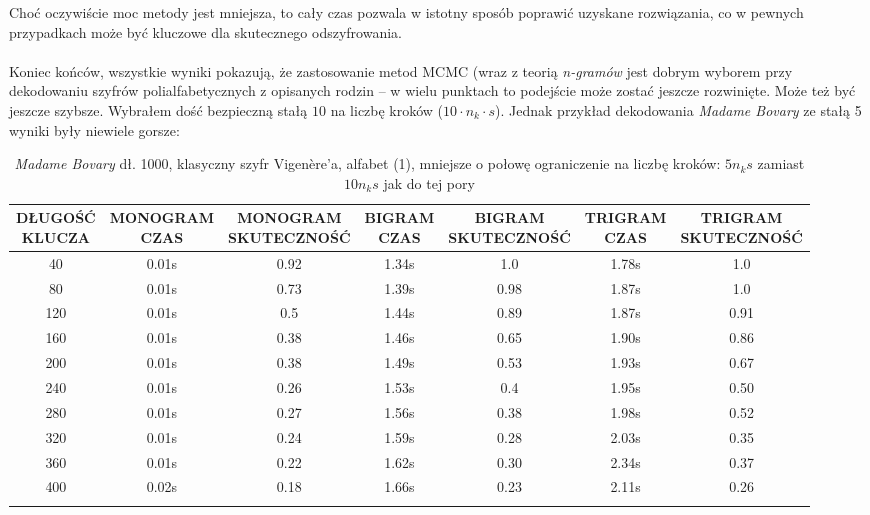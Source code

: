 \documentclass[a4paper]{article}
\theoremstyle{defn}
\theoremstyle{theorem}
\theoremstyle{lemma}
\theoremstyle{cor}
\theoremstyle{fact}
\begin{document}
Choć oczywiście moc metody jest mniejsza, to cały czas pozwala w istotny sposób poprawić uzyskane rozwiązania, co w pewnych przypadkach może być kluczowe dla skutecznego odszyfrowania.\\\\
Koniec końców, wszystkie wyniki pokazują, że zastosowanie metod MCMC (wraz z teorią \textit{n-gramów} jest dobrym wyborem przy dekodowaniu szyfrów polialfabetycznych z opisanych rodzin – w wielu punktach to podejście może zostać jeszcze rozwinięte. Może też być jeszcze szybsze. Wybrałem dość bezpieczną stałą $10$ na liczbę kroków ($10 \cdot n_k \cdot s$). Jednak przykład dekodowania \textit{Madame Bovary} ze stałą 5 wyniki były niewiele gorsze:
\begin{center}\begin{small}\begin{longtable}{|c|c|c|c|c|c|c|} 
\hline \makecell{DŁUGOŚĆ\\KLUCZA} &  \makecell{MONOGRAM\\CZAS} & \makecell{MONOGRAM\\SKUTECZNOŚĆ} & \makecell{BIGRAM\\CZAS} &  \makecell{BIGRAM\\SKUTECZNOŚĆ} & \makecell{TRIGRAM\\CZAS} & \makecell{TRIGRAM\\SKUTECZNOŚĆ}\\ \hline 
40 & 0.01s & 0.92 & 1.34s & 1.0 & 1.78s & 1.0 \\ \hline 
80 & 0.01s & 0.73 & 1.39s & 0.98 & 1.87s & 1.0 \\ \hline 
120 & 0.01s & 0.5 & 1.44s & 0.89 & 1.87s & 0.91 \\ \hline 
160 & 0.01s & 0.38 & 1.46s & 0.65 & 1.90s & 0.86 \\ \hline 
200 & 0.01s & 0.38 & 1.49s & 0.53 & 1.93s & 0.67 \\ \hline 
240 & 0.01s & 0.26 & 1.53s & 0.4 & 1.95s & 0.50 \\ \hline 
280 & 0.01s & 0.27 & 1.56s & 0.38 & 1.98s & 0.52 \\ \hline 
320 & 0.01s & 0.24 & 1.59s & 0.28 & 2.03s & 0.35 \\ \hline 
360 & 0.01s & 0.22 & 1.62s & 0.30 & 2.34s & 0.37 \\ \hline 
400 & 0.02s & 0.18 & 1.66s & 0.23 & 2.11s & 0.26 \\ \hline 
\caption{\textit{Madame Bovary} dł. 1000, klasyczny szyfr Vigenère'a, alfabet (1), mniejsze o połowę ograniczenie na liczbę kroków: $5n_k s$ zamiast $10 n_k s$ jak do tej pory}
\end{longtable}\end{small}\end{center} 
\end{document}

